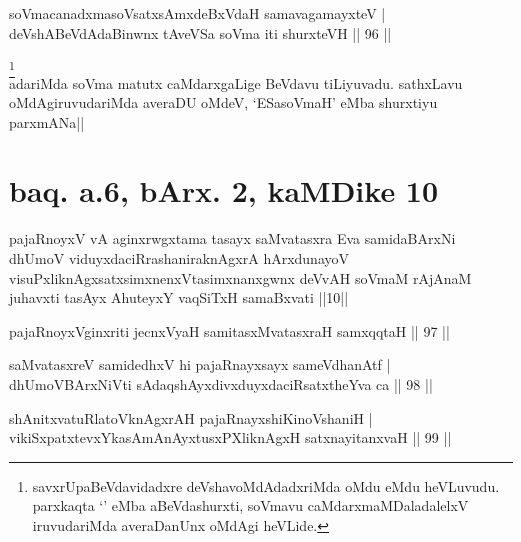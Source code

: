 \begin{shl}
soVmacanadxmasoVsatxsAmxdeBxVdaH samavagamayxteV | \\
deVshABeVdAdaBinwnx tAveVSa soVma iti shurxteVH \hfill|| 96 || 
\end{shl}

\begin{artha}
\footnote[1]{savxrUpaBeVdavidadxre deVshavoMdAdadxriMda oMdu eMdu 
heVLuvudu. parxkaqta `\stext' eMba aBeVdashurxti, soVmavu 
caMdarxmaMDaladalelxV iruvudariMda averaDanUnx oMdAgi heVLide.}\\
adariMda soVma matutx caMdarxgaLige BeVdavu tiLiyuvadu. sathxLavu 
oMdAgiruvudariMda averaDU oMdeV, `ESasoVmaH' eMba shurxtiyu parxmANa||
\end{artha}


\section*{baq. a.6, bArx. 2, kaMDike 10}

\begin{shl}
pajaRnoyxV vA aginxrwgxtama tasayx saMvatasxra Eva samidaBArxNi dhUmoV viduyxdaciRrashaniraknAgxrA hArxdunayoV visuPxliknAgxsatxsimxnenxVtasimxnanxgwnx deVvAH soVmaM rAjAnaM juhavxti tasAyx AhuteyxY vaqSiTxH samaBxvati ||10||
\end{shl}

\begin{shl}
pajaRnoyxV\s ginxriti jecnxVyaH samitasxMvatasxraH samxqqtaH \hfill|| 97 || 
\end{shl}

\begin{shl}
saMvatasxreV samidedhxV hi pajaRnayxsayx sameVdhanAtf | \\
dhUmoV\s BArxNiVti sAdaqshAyxdivxduyxdaciRsatxtheYva ca \hfill|| 98 || 
\end{shl}

\begin{shl}
shAnitxvatuRlatoV\s knAgxrAH pajaRnayxshiKinoV\s shaniH | \\
vikiSxpatxtevxYkasAmAnAyxtusxPXliknAgxH satxnayitanxvaH \hfill|| 99 || 
\end{shl}

